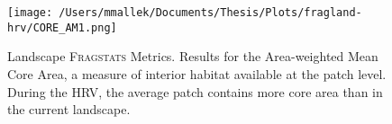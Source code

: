 \begin{figure}[!htbp]
  \centering
  \texttt{[image: /Users/mmallek/Documents/Thesis/Plots/fragland-hrv/CORE\_AM1.png]}
\caption{Landscape \textsc{Fragstats} Metrics. Results for the Area-weighted Mean Core Area, a measure of interior habitat available at the patch level. During the HRV, the average patch contains more core area than in the current landscape.} 
\label{fig:fragland_core}
\end{figure}
